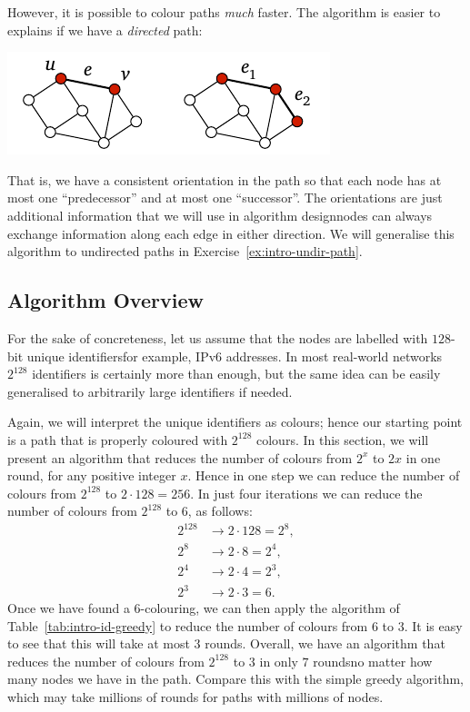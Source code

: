 However, it is possible to colour paths \emph{much} faster. The algorithm is easier to explains if we have a \emph{directed} path:
\begin{center}
    \includegraphics[page=\PIntroIdDir]{figs.pdf}
\end{center}
That is, we have a consistent orientation in the path so that each node has at most one ``predecessor'' and at most one ``successor''. The orientations are just additional information that we will use in algorithm design\mydash nodes can always exchange information along each edge in either direction. We will generalise this algorithm to undirected paths in Exercise~\ref{ex:intro-undir-path}.


\subsection{Algorithm Overview}

For the sake of concreteness, let us assume that the nodes are labelled with $128$-bit unique identifiers\mydash for example, IPv6 addresses. In most real-world networks $2^{128}$ identifiers is certainly more than enough, but the same idea can be easily generalised to arbitrarily large identifiers if needed.

Again, we will interpret the unique identifiers as colours; hence our starting point is a path that is properly coloured with $2^{128}$ colours. In this section, we will present an algorithm that reduces the number of colours from $2^x$ to $2x$ in one round, for any positive integer $x$. Hence in one step we can reduce the number of colours from $2^{128}$ to $2 \cdot 128 = 256$. In just four iterations we can reduce the number of colours from $2^{128}$ to $6$, as follows:
\begin{align*}
    2^{128} &\to 2 \cdot 128 = 2^8, \\
    2^8 &\to 2 \cdot 8 = 2^4, \\
    2^4 &\to 2 \cdot 4 = 2^3, \\
    2^3 &\to 2 \cdot 3 = 6.
\end{align*}
Once we have found a $6$-colouring, we can then apply the algorithm of Table~\ref{tab:intro-id-greedy} to reduce the number of colours from $6$ to $3$. It is easy to see that this will take at most $3$ rounds. Overall, we have an algorithm that reduces the number of colours from $2^{128}$ to $3$ in only $7$ rounds\mydash no matter how many nodes we have in the path. Compare this with the simple greedy algorithm, which may take millions of rounds for paths with millions of nodes.


